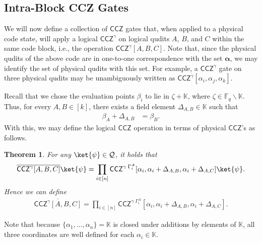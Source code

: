 \documentclass[11pt]{article}
\newtheorem{theorem}{Theorem}[section]
\theoremstyle{definition}
\newcommand{\CCZ}{\mathsf{CCZ}}
\newcommand{\bbF}{\mathbb{F}}
\newcommand{\qcode}{\mathcal{Q}}
\newcommand{\KK}{\mathbb{K}}
\newcommand*{\ol}{\overline}
\begin{document}
\subsection{Intra-Block CCZ Gates}

We will now define a collection of $\CCZ$ gates that, when applied to a physical code state, will apply a logical $\CCZ^\gamma$ on logical qudits $A$, $B$, and $C$ within the same code block, i.e., the operation $\ol{\CCZ^\gamma[A,B,C]}$. Note that, since the physical    qudits of the above code are in one-to-one correspondence with the set $\mathbf{\alpha}$, we may identify the set of physical qudits with this set. For example, a $\CCZ^\gamma$ gate on three physical qudits may be unambiguously written as $\CCZ^\gamma[\alpha_i, \alpha_j, \alpha_k]$.

Recall that we chose the evaluation points $\beta_i$ to lie in $\zeta + \KK$, where $\zeta \in \bbF_q \backslash \KK$. Thus, for every $A,B \in [k]$, there exists a field element $\Delta_{A,B} \in \KK$ such that 
\begin{align}
    \beta_A + \Delta_{A,B} &= \beta_B.
\end{align}
With this, we may define the logical $\CCZ$ operation in terms of physical $\CCZ$'s as follows.

\begin{theorem} \label{thm:intra-block}
    For any $\ket{\psi} \in \qcode$, it holds that
    \begin{align}
        \ol{\CCZ^\gamma[A,B,C]} \ket{\psi} 
        = \prod_{i \in [n]} \CCZ^{\gamma\;\Gamma^A_i}[\alpha_i, \alpha_i + \Delta_{A,B}, \alpha_i + \Delta_{A,C}] \ket{\psi}.
    \end{align}
    Hence we can define
    \begin{align}
        \ol{\CCZ^\gamma[A,B,C]} 
        = \prod_{i \in [n]} \CCZ^{\gamma\;\Gamma^A_i}[\alpha_i, \alpha_i + \Delta_{A,B}, \alpha_i + \Delta_{A,C}]. \label{eqn:intra-CCZ-def}
    \end{align}
\end{theorem}
Note that because $\{ \alpha_1, \dots, \alpha_n \} = \KK$ is closed under additions by elements of $\KK$, all three coordinates are well defined for each $\alpha_i \in \KK$. 
\end{document}
